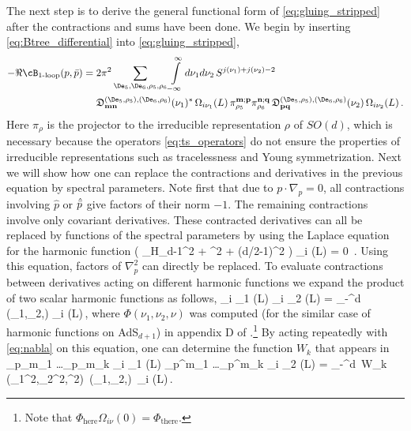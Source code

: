 The next step is to derive the general functional form of \eqref{eq:gluing_stripped} after the contractions and sums have been done. We begin by inserting \eqref{eq:Btree_differential} into \eqref{eq:gluing_stripped},
	\begin{align}
- \Re \cB_{\text{1-loop}} (p,\pb)={}& 2\pi^{2}  \sum\limits_{\De_5,\De_6,\rho_5,\rho_6} \int\limits_{-\infty}^\infty d\nu_1 d\nu_2 \, S^{j(\nu_1) + j(\nu_2)-2} 
		\label{eq:Btilde_neater_fs} \\
		&\mathfrak{D}^{(\De_5,\rho_5),(\De_6,\rho_6)}_{\mathbf{m} \mathbf{n}} (\nu_1)^*\, \Omega_{i \nu_1} (L)
		\,\pi_{\rho_{5}}^{\mathbf{m}; \mathbf{p}}
		\pi_{\rho_{6}}^{\mathbf{n}; \mathbf{q}}
		\,\mathfrak{D}^{(\De_5,\rho_5),(\De_6,\rho_6)}_{\mathbf{p} \mathbf{q}} (\nu_2)
		 \,\Omega_{i \nu_2} (L)\,.
		\nonumber
	\end{align}
Here $\pi_\rho$ is the projector to the irreducible representation $\rho$ of $SO(d)$, which is necessary because the operators \eqref{eq:ts_operators} do not ensure the properties of irreducible representations such as tracelessness and Young symmetrization.
Next we will show how one can replace the contractions and derivatives in the previous equation by spectral parameters.
Note first that due to $p \cdot \nabla_p = 0$, all contractions involving $\hat{p}$ or $\hat{{\bar{p}}}$ give factors of their norm $-1$. The remaining contractions involve only covariant derivatives. These contracted derivatives can all be replaced by functions of the spectral parameters by using the Laplace equation for the harmonic function
	\beq
		\left( \nabla_{H_{d-1}}^2 + \nu^2 + (d/2-1)^2 \right) \Omega_{i \nu} (L) = 0 \,.
		\label{eq:nabla}
	\eeq
Using this equation, factors of $\nabla_p^2$ can directly be replaced.
To evaluate contractions between derivatives acting on different harmonic functions we expand the product of two scalar harmonic functions as follows,
	\beq
		\Omega_{i \nu_1} (L) \Omega_{i \nu_2} (L) = \int\limits_{-\infty}^\infty d\nu \, \Phi(\nu_1,\nu_2,\nu) \Omega_{i \nu} (L)\,,
		\label{eq:Omega_prod}
	\eeq
where $\Phi(\nu_1,\nu_2,\nu)$ was computed (for the similar case of harmonic functions on AdS$_{d+1}$) in appendix D of \cite{Penedones:2010ue}.\footnote{Note that $\Phi_{\text{here}} \Omega_{i \nu}(0)=\Phi_{\text{there}}$.}
By acting repeatedly with \eqref{eq:nabla} on this equation, one can determine the function $W_k$ that appears in
	\beq
		{\nabla_{p}}_{m_1} \ldots {\nabla_{p}}_{m_k}   \Omega_{i \nu_1} (L)
		\nabla_p^{m_1} \ldots \nabla_p^{m_k} \Omega_{i \nu_2} (L) =
		\int\limits_{-\infty}^\infty d\nu \, W_{k} \big(\nu_1^2,\nu_2^2,\nu^2\big)\, \Phi(\nu_1,\nu_2,\nu) \,\Omega_{i \nu} (L)\,.
